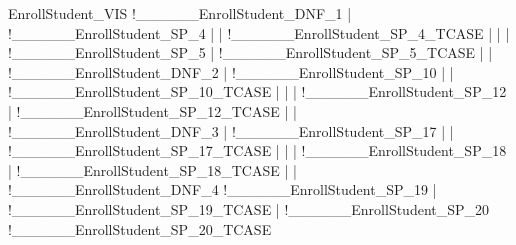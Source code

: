 
EnrollStudent_VIS
  !______EnrollStudent_DNF_1
  |	  !______EnrollStudent_SP_4
  |	  |	  !______EnrollStudent_SP_4_TCASE
  |	  |
  |	  !______EnrollStudent_SP_5
  |	  	  !______EnrollStudent_SP_5_TCASE
  |	
  |
  !______EnrollStudent_DNF_2
  |	  !______EnrollStudent_SP_10
  |	  |	  !______EnrollStudent_SP_10_TCASE
  |	  |
  |	  !______EnrollStudent_SP_12
  |	  	  !______EnrollStudent_SP_12_TCASE
  |	
  |
  !______EnrollStudent_DNF_3
  |	  !______EnrollStudent_SP_17
  |	  |	  !______EnrollStudent_SP_17_TCASE
  |	  |
  |	  !______EnrollStudent_SP_18
  |	  	  !______EnrollStudent_SP_18_TCASE
  |	
  |
  !______EnrollStudent_DNF_4
  	  !______EnrollStudent_SP_19
  	  |	  !______EnrollStudent_SP_19_TCASE
  	  |
  	  !______EnrollStudent_SP_20
  	  	  !______EnrollStudent_SP_20_TCASE

